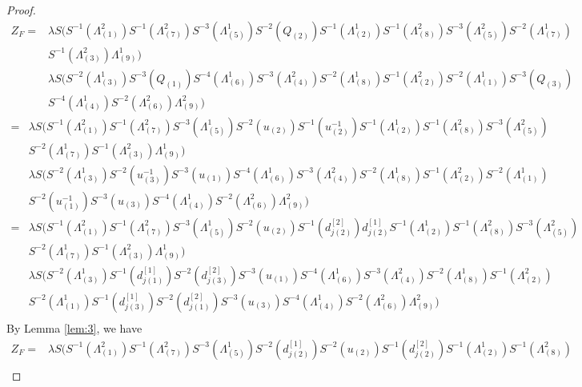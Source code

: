 \documentclass[12pt]{amsart}
\begin{document}
\begin{proof}
\[
\begin{aligned}
Z_F=&\lambda S (S^{-1}(\Lambda^2_{(1)})S^{-1}(\Lambda^2_{(7)})S^{-3}(\Lambda^1_{(5)})S^{-2}(Q_{(2)})S^{-1}(\Lambda^1_{(2)})S^{-1}(\Lambda^2_{(8)})S^{-3}(\Lambda^2_{(5)})S^{-2}(\Lambda^1_{(7)})\\
&S^{-1}(\Lambda^2_{(3)})\Lambda^1_{(9)})\\
&\lambda S(S^{-2}(\Lambda^1_{(3)})S^{-3}(Q_{(1)})S^{-4}(\Lambda^{1}_{(6)})S^{-3}(\Lambda^2_{(4)})S^{-2}(\Lambda^1_{(8)})S^{-1}(\Lambda^2_{(2)})S^{-2}(\Lambda^1_{(1)})S^{-3}(Q_{(3)})\\
&S^{-4}(\Lambda^1_{(4)})S^{-2}(\Lambda^2_{(6)})\Lambda^2_{(9)})
\end{aligned}\]
\[\begin{aligned}
=&\lambda S (S^{-1}(\Lambda^2_{(1)})S^{-1}(\Lambda^2_{(7)})S^{-3}(\Lambda^1_{(5)})S^{-2}(u_{(2)})S^{-1}(u^{-1}_{(2)})S^{-1}(\Lambda^1_{(2)})S^{-1}(\Lambda^2_{(8)})S^{-3}(\Lambda^2_{(5)})\\
&S^{-2}(\Lambda^1_{(7)})S^{-1}(\Lambda^2_{(3)})\Lambda^1_{(9)})\\
&\lambda S(S^{-2}(\Lambda^1_{(3)})S^{-2}(u^{-1}_{(3)})S^{-3}(u_{(1)})S^{-4}(\Lambda^{1}_{(6)})S^{-3}(\Lambda^2_{(4)})S^{-2}(\Lambda^1_{(8)})S^{-1}(\Lambda^2_{(2)})S^{-2}(\Lambda^1_{(1)})\\
&S^{-2}(u^{-1}_{(1)})S^{-3}(u_{(3)})S^{-4}(\Lambda^1_{(4)})S^{-2}(\Lambda^2_{(6)})\Lambda^2_{(9)})\\	
=&\lambda S (S^{-1}(\Lambda^2_{(1)})S^{-1}(\Lambda^2_{(7)})S^{-3}(\Lambda^1_{(5)})S^{-2}(u_{(2)})S^{-1}(d^{[2]}_{j(2)})d^{[1]}_{j(2)}S^{-1}(\Lambda^1_{(2)})S^{-1}(\Lambda^2_{(8)})S^{-3}(\Lambda^2_{(5)})\\
&S^{-2}(\Lambda^1_{(7)})S^{-1}(\Lambda^2_{(3)})\Lambda^1_{(9)})\\
&\lambda S(S^{-2}(\Lambda^1_{(3)})S^{-1}(d^{[1]}_{j(1)})S^{-2}(d^{[2]}_{j(3)})S^{-3}(u_{(1)})S^{-4}(\Lambda^{1}_{(6)})S^{-3}(\Lambda^2_{(4)})S^{-2}(\Lambda^1_{(8)})S^{-1}(\Lambda^2_{(2)})\\
&S^{-2}(\Lambda^1_{(1)})S^{-1}(d^{[1]}_{j(3)})S^{-2}(d^{[2]}_{j(1)})S^{-3}(u_{(3)})S^{-4}(\Lambda^1_{(4)})S^{-2}(\Lambda^2_{(6)})\Lambda^2_{(9)})\\
\end{aligned}\]
By Lemma \ref{lem:3}, we have 
\[\begin{aligned}
Z_F=&\lambda S (S^{-1}(\Lambda^2_{(1)})S^{-1}(\Lambda^2_{(7)})S^{-3}(\Lambda^1_{(5)})S^{-2}(d^{[1]}_{j(2)})S^{-2}(u_{(2)})S^{-1}(d^{[2]}_{j(2)})S^{-1}(\Lambda^1_{(2)})S^{-1}(\Lambda^2_{(8)})\\

\end{aligned}\]
\end{proof}
\end{document}

